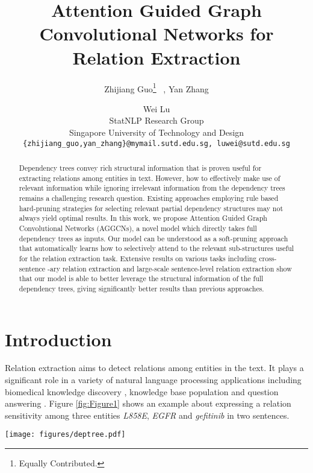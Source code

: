 \documentclass[11pt,a4paper]{article}
\title{Attention Guided Graph Convolutional Networks for Relation Extraction}
\author{Zhijiang Guo\thanks{Equally Contributed.} ~, Yan Zhang \and Wei Lu \\
StatNLP Research Group\\
 Singapore University of Technology and Design \\
   \texttt{\{zhijiang\_guo,yan\_zhang\}@mymail.sutd.edu.sg, luwei@sutd.edu.sg}\\
}
\date{}
\begin{document}
\maketitle

\begin{abstract}
Dependency trees convey rich structural information that is proven useful for extracting relations among entities in text. However, how to effectively make use of relevant information while ignoring irrelevant information from the dependency trees remains a challenging research question. Existing approaches employing rule based hard-pruning strategies for selecting relevant partial dependency structures may not always yield optimal results. In this work, we propose Attention Guided Graph Convolutional Networks (AGGCNs), a novel model which directly takes full dependency trees as inputs. Our model can be understood as a soft-pruning approach that automatically learns how to selectively attend to the relevant sub-structures useful for the relation extraction task. Extensive results on various tasks including cross-sentence -ary relation extraction and large-scale sentence-level relation extraction show that our model is able to better leverage the structural information of the full dependency trees, giving significantly better results than previous approaches.
\end{abstract}

\section{Introduction}
\label{sec:1}

Relation extraction aims to detect relations among entities in the text. It plays a significant role in a variety of natural language processing applications including biomedical knowledge discovery \citep{Quirk2017DistantSF}, knowledge base population \citep{Zhang2017PositionawareAA} and question answering \citep{Yu2017ImprovedNR}. Figure \ref{fig:Figure1} shows an example about expressing a relation sensitivity among three entities \textit{L858E}, \textit{EGFR} and \textit{gefitinib} in two sentences.

\begin{figure*}
    \centering
    \texttt{[image: figures/deptree.pdf]}
\caption{An example dependency tree for two sentences expressing a relation (sensitivity) among three entities. The shortest dependency path between these entities is highlighted in bold (edges and tokens). The root node of the LCA subtree of entities is \textit{present}. The dotted edges indicate tokens =1 away from the subtree. Note that tokens \textit{partial response} off these paths (shortest dependency path, LCA subtree, pruned tree when =1).}
    \label{fig:Figure1}
\end{figure*}
\end{document}
